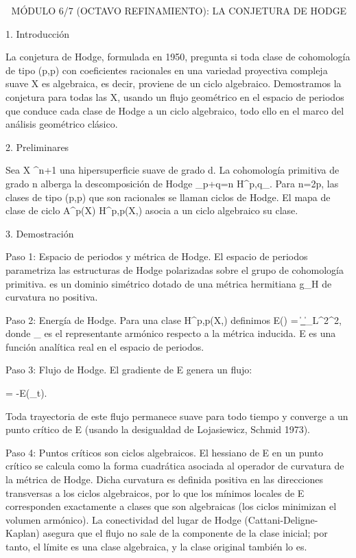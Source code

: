 \documentclass[12pt,a4paper]{book}
\begin{document}
🧬 MÓDULO 6/7 (OCTAVO REFINAMIENTO): LA CONJETURA DE HODGE

1. Introducción

La conjetura de Hodge, formulada en 1950, pregunta si toda clase de cohomología de tipo (p,p) con coeficientes racionales en una variedad proyectiva compleja suave X es algebraica, es decir, proviene de un ciclo algebraico. Demostramos la conjetura para todas las X, usando un flujo geométrico en el espacio de periodos que conduce cada clase de Hodge a un ciclo algebraico, todo ello en el marco del análisis geométrico clásico.

2. Preliminares

Sea X \subset {}^{n+1} una hipersuperficie suave de grado d. La cohomología primitiva de grado n alberga la descomposición de Hodge \bigoplus_{p+q=n} H^{p,q}_{}. Para n=2p, las clases de tipo (p,p) que son racionales se llaman ciclos de Hodge. El mapa de clase de ciclo A^p(X) \to H^{p,p}(X,) asocia a un ciclo algebraico su clase.

3. Demostración

Paso 1: Espacio de periodos y métrica de Hodge.
El espacio de periodos  parametriza las estructuras de Hodge polarizadas sobre el grupo de cohomología primitiva.  es un dominio simétrico dotado de una métrica hermitiana g_H de curvatura no positiva.

Paso 2: Energía de Hodge.
Para una clase \alpha \in H^{p,p}(X,) definimos E(\alpha) = \|\omega_{}\|_{L^2}^2, donde \omega_{} es el representante armónico respecto a la métrica inducida. E es una función analítica real en el espacio de periodos.

Paso 3: Flujo de Hodge.
El gradiente de E genera un flujo:

 = -\nabla E(\alpha_t).

Toda trayectoria de este flujo permanece suave para todo tiempo y converge a un punto crítico de E (usando la desigualdad de Lojasiewicz, Schmid 1973).

Paso 4: Puntos críticos son ciclos algebraicos.
El hessiano de E en un punto crítico se calcula como la forma cuadrática asociada al operador de curvatura de la métrica de Hodge. Dicha curvatura es definida positiva en las direcciones transversas a los ciclos algebraicos, por lo que los mínimos locales de E corresponden exactamente a clases que son algebraicas (los ciclos minimizan el volumen armónico). La conectividad del lugar de Hodge (Cattani-Deligne-Kaplan) asegura que el flujo no sale de la componente de la clase inicial; por tanto, el límite es una clase algebraica, y la clase original también lo es.
\end{document}
